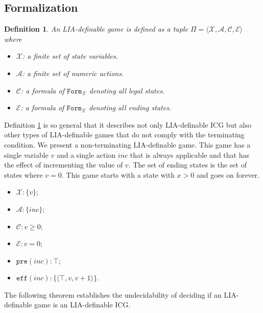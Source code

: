 \documentclass[review]{elsarticle}
\newcommand{\formula}{\mathtt{Form}}
\newcommand{\set}[1]{\{ #1 \}}
\newcommand{\tuple}[1]{\langle {#1} \rangle}
\newcommand{\true}{\top}
\newcommand{\statevar}{\mathcal{X}}
\newcommand{\act}{\mathcal{A}}
\newcommand{\constraint}{\mathcal{C}}
\newcommand{\estate}{\mathcal{E}}
\newcommand{\pre}{\mathtt{pre}}
\newcommand{\eff}{\mathtt{eff}}
\newtheorem{definition}{Definition}
\begin{document}
	\subsection{Formalization}
	\begin{definition} \label{def:game} \rm
		An LIA-definable game is defined as a tuple $\Pi = \tuple{\statevar, \act, \constraint, \estate}$ where 
		\begin{itemize}
			\item $\statevar$: a finite set of state variables. 
			\item $\act$: a finite set of numeric actions.			
			\item $\constraint$: a formula of $\formula_{\statevar}$ denoting all legal states.
			\item $\estate$: a formula of $\formula_{\statevar}$ denoting all ending states. 
		\end{itemize}
	\end{definition}
	
	Definition \ref{def:game} is so general that it describes not only LIA-definable ICG but also other types of LIA-definable games that do not comply with the terminating condition.
	We present a non-terminating LIA-definable game.
	This game has a single variable $v$ and a single action $inc$ that is always applicable and that has the effect of incrementing the value of $v$.
	The set of ending states is the set of states where $v = 0$.
	This game starts with a state with $x > 0$ and goes on forever.
	\begin{itemize}		    
		\item $\statevar: \set{v}$;
		\item $\act:\set{inc}$;
		\item $\constraint: v \ge 0$;
		\item $\estate: v = 0$;
		\item $\pre(inc): \true$;
		\item $\eff(inc): \set{\tuple{\true, v, v + 1}}$.
	\end{itemize}
	
	The following theorem establishes the undecidability of deciding if an LIA-definable game is an LIA-definable ICG.
	
\end{document}
